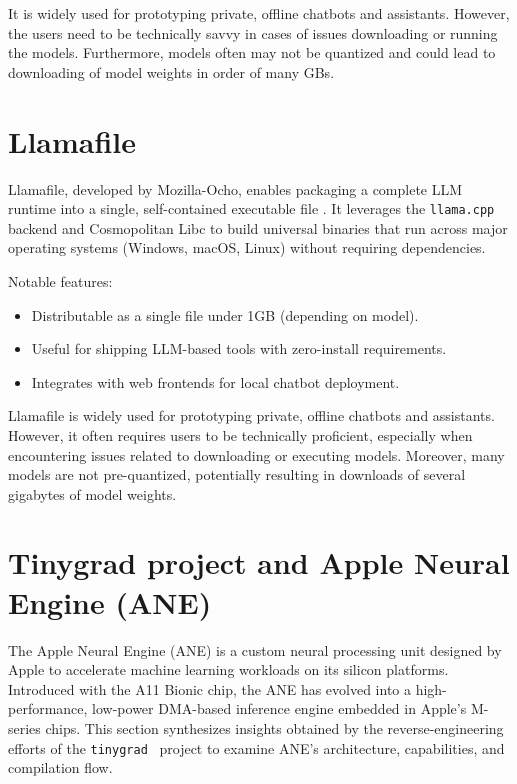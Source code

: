 It is widely used for prototyping private, offline chatbots and assistants. However, the users need to be technically savvy in cases of issues downloading or running the models. Furthermore, models often may not be quantized and could lead to downloading of model weights in order of many GBs.


\section{Llamafile}
\label{sec:llamafile}


Llamafile, developed by Mozilla-Ocho, enables packaging a complete LLM runtime into a single, self-contained executable file \cite{llamafile}. It leverages the \texttt{llama.cpp} backend and Cosmopolitan Libc to build universal binaries that run across major operating systems (Windows, macOS, Linux) without requiring dependencies.

Notable features:
\begin{itemize}
    \item Distributable as a single file under 1GB (depending on model).
    \item Useful for shipping LLM-based tools with zero-install requirements.
    \item Integrates with web frontends for local chatbot deployment.
\end{itemize}

Llamafile is widely used for prototyping private, offline chatbots and assistants. However, it often requires users to be technically proficient, especially when encountering issues related to downloading or executing models. Moreover, many models are not pre-quantized, potentially resulting in downloads of several gigabytes of model weights.
\section{Tinygrad project and Apple Neural Engine (ANE)}
\label{sec:ANEAPI}

The Apple Neural Engine (ANE) is a custom neural processing unit designed by Apple to accelerate machine learning workloads on its silicon platforms. Introduced with the A11 Bionic chip, the ANE has evolved into a high-performance, low-power DMA-based inference engine embedded in Apple's M-series chips. This section synthesizes insights obtained by the reverse-engineering efforts of the \texttt{tinygrad}~\cite{tinygrad2023ane} project to examine ANE's architecture, capabilities, and compilation flow.

